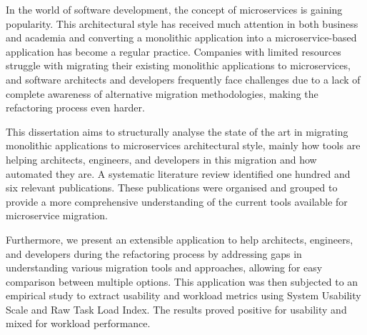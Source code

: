 In the world of software development, the concept of microservices is gaining
popularity. This architectural style has received much attention in both
business and academia and converting a monolithic application into a
microservice-based application has become a regular practice. Companies with
limited resources struggle with migrating their existing monolithic
applications to microservices, and software architects and developers
frequently face challenges due to a lack of complete awareness of alternative
migration methodologies, making the refactoring process even harder.

This dissertation aims to structurally analyse the state of the art in
migrating monolithic applications to microservices architectural style, mainly
how tools are helping architects, engineers, and developers in this migration
and how automated they are. A systematic literature review identified one
hundred and six relevant publications. These publications were organised and
grouped to provide a more comprehensive understanding of the current tools
available for microservice migration.

Furthermore, we present an extensible application to help architects,
engineers, and developers during the refactoring process by addressing gaps in
understanding various migration tools and approaches, allowing for easy
comparison between multiple options. This application was then subjected to an
empirical study to extract usability and workload metrics using System
Usability Scale and Raw Task Load Index. The results proved positive for
usability and mixed for workload performance.
